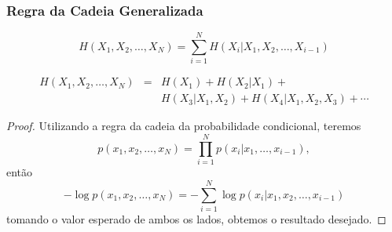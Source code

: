 \begin{frame}[allowframebreaks]
  \frametitle{Regra da Cadeia Generalizada}
  \begin{theorem}
  \begin{equation}
  H(X_1, X_2, \ldots, X_N) = \sum_{i=1}^N H(X_i | X_1, X_2, \ldots, X_{i-1}) 
  \end{equation}
  \end{theorem}

  \begin{eqnarray}
  H(X_1, X_2, \ldots, X_N) &=& H(X_1) + H(X_2 | X_1) + \\
        && H(X_3 | X_1, X_2) + H(X_4 | X_1, X_2, X_3) + \cdots \nonumber
  \end{eqnarray}
  
  \framebreak
  \begin{proof}
  Utilizando a regra da cadeia da probabilidade condicional, teremos
  \begin{equation}
  p(x_1, x_2, \ldots, x_N) = \prod_{i=1}^N p(x_i | x_1, \ldots , x_{i-1}) ,
  \end{equation}
  então
  \begin{equation}
  - \log p(x_1, x_2, \ldots, x_N) = - \sum_{i=1}^N \log p(x_i | x_1, x_2, \ldots , x_{i-1}) 
  \end{equation}
  tomando o valor esperado de ambos os lados, obtemos o resultado desejado.
  \end{proof}
\end{frame}


